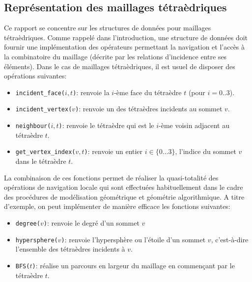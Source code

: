 \subsection{Représentation des maillages tétraèdriques}
\label{representation_maillages_tetra}
\noindent
Ce rapport se concentre sur les structures de données pour maillages tétraèdriques. Comme rappelé dans l'introduction, une structure de données doit fournir une implémentation des opérateurs permettant la navigation et l'accès à la combinatoire du maillage (décrite par les relations d'incidence entre ses éléments). Dans le cas de maillages tétraèdriques, il est usuel de disposer des opérations suivantes:
\begin{itemize}
\item \texttt{incident\_face($i,t$)}: renvoie la $i$-ème face du tétraèdre $t$ (pour $i=0..3$).
\item \texttt{incident\_vertex($v$)}: renvoie un des tétraèdres incidents au sommet $v$.
\item \texttt{neighbour($i, t$)}: renvoie le tétraèdre qui est le $i$-ème voisin adjacent au tétraèdre $t$. 
\item \texttt{get\_vertex\_index($v,t$)}: renvoie un entier $i\in\{0 \ldots 3 \}$, l'indice du sommet $v$ dans le tétraèdre $t$.
\end{itemize}
\noindent
La combinaison de ces fonctions permet de réaliser la quasi-totalité des opérations de navigation locale qui sont effectuées habituellement
dans le cadre des procédures de modélisation géométrique et géométrie algorithmique. A titre d'exemple, on peut implémenter de manière efficace les fonctions suivantes:
\begin{itemize}
\item \texttt{degree($v$)}: renvoie le degré d'un sommet $v$
\item \texttt{hypersphere($v$)}: renvoie l'hypersphère ou l'étoile d'un sommet $v$, c'est-à-dire l'ensemble des tétraèdres incidents à $v$.
\item \texttt{BFS($t$)}: réalise un parcours en largeur du maillage en commen\c cant par le tétraèdre $t$.
\end{itemize}
